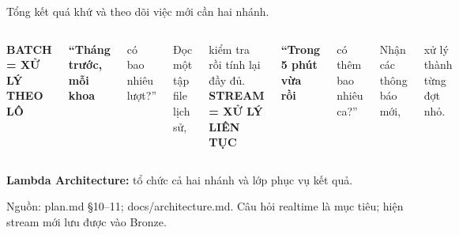 \documentclass[aspectratio=169,11pt]{beamer}
\renewcommand{\small}{\fontsize{18}{24}\selectfont}
\renewcommand{\footnotesize}{\fontsize{13}{17}\selectfont}
\newcommand{\labeltext}[1]{{\fontsize{13}{17}\selectfont\bfseries\color{teal}#1}}
\newcommand{\source}[1]{\vfill{\footnotesize\color{muted}Nguồn: #1\par}}
\begin{document}
\begin{frame}{Tổng kết quá khứ và theo dõi việc mới cần hai nhánh.}
  \begin{columns}[T,onlytextwidth]
      \labeltext{BATCH = XỬ LÝ THEO LÔ}\par\vspace{5mm}
      {\fontsize{29}{36}\selectfont\bfseries “Tháng trước, mỗi khoa\par có bao nhiêu lượt?”\par}\vspace{7mm}
      Đọc một tập file lịch sử,\par kiểm tra rồi tính lại đầy đủ.
      \labeltext{STREAM = XỬ LÝ LIÊN TỤC}\par\vspace{5mm}
      {\fontsize{29}{36}\selectfont\bfseries “Trong 5 phút vừa rồi\par có thêm bao nhiêu ca?”\par}\vspace{7mm}
      Nhận các thông báo mới,\par xử lý thành từng đợt nhỏ.
  \end{columns}
  \vspace{10mm}
  {\small\color{teal}\textbf{Lambda Architecture:} tổ chức cả hai nhánh và lớp phục vụ kết quả.}
  \source{plan.md §10–11; docs/architecture.md. Câu hỏi realtime là mục tiêu; hiện stream mới lưu được vào Bronze.}
\end{frame}
\end{document}

